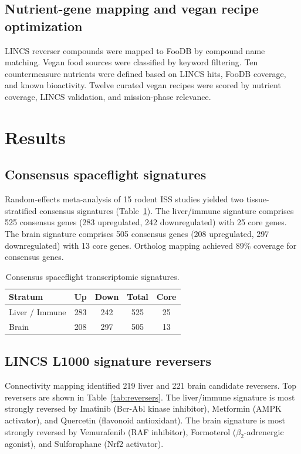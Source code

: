 \documentclass[11pt,a4paper]{article}
\begin{document}
\subsection{Nutrient-gene mapping and vegan recipe optimization}
LINCS reverser compounds were mapped to FooDB \citep{wishart2020foodb} by compound name matching. 
Vegan food sources were classified by keyword filtering. Ten countermeasure nutrients were defined 
based on LINCS hits, FooDB coverage, and known bioactivity. Twelve curated vegan recipes were scored 
by nutrient coverage, LINCS validation, and mission-phase relevance.

\section{Results}

\subsection{Consensus spaceflight signatures}
Random-effects meta-analysis of 15 rodent ISS studies yielded two tissue-stratified consensus 
signatures (Table~\ref{tab:signatures}). The liver/immune signature comprises 
525 consensus genes (283 
upregulated, 242 downregulated) with 25 
core genes. The brain signature comprises 505 consensus 
genes (208 upregulated, 297 downregulated) 
with 13 core genes. Ortholog mapping achieved 89\% coverage for 
consensus genes.

\begin{table}[ht]
\centering
\caption{Consensus spaceflight transcriptomic signatures.}
\label{tab:signatures}
\begin{tabular}{lcccc}
\toprule
\textbf{Stratum} & \textbf{Up} & \textbf{Down} & \textbf{Total} & \textbf{Core} \\
\midrule
Liver / Immune & 283 & 242 & 525 & 25 \\
Brain          & 208 & 297 & 505 & 13 \\
\bottomrule
\end{tabular}
\end{table}

\subsection{LINCS L1000 signature reversers}
Connectivity mapping identified 219 liver and 221 brain candidate reversers. Top reversers are 
shown in Table~\ref{tab:reversers}. The liver/immune signature is most strongly reversed by Imatinib 
(Bcr-Abl kinase inhibitor), Metformin (AMPK activator), and Quercetin (flavonoid antioxidant). The 
brain signature is most strongly reversed by Vemurafenib (RAF inhibitor), Formoterol ($\beta_2$-adrenergic 
agonist), and Sulforaphane (Nrf2 activator).
\end{document}
